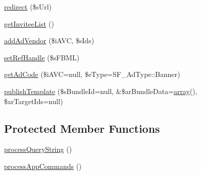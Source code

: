 \begin{DoxyCompactItemize}
\item 
\hyperlink{classSFApplication_a83d6db3f4e5f36ddd8adad2f53133e76}{redirect} (\$sUrl)
\item 
\hyperlink{classSFApplication_acf7865241ab5ac45a0f04674efe51d1a}{getInviteeList} ()
\item 
\hyperlink{classSFApplication_af12c69561c23be5e6fc7e4e0a2808fbb}{addAdVendor} (\$iAVC, \$sIds)
\item 
\hyperlink{classSFApplication_a3978cc0d9152ece4cd315601a95a38bd}{setRefHandle} (\$sFBML)
\item 
\hyperlink{classSFApplication_a99e97980251298d31efe3451470e8df5}{getAdCode} (\$iAVC=null, \$eType=SF\_\-AdType::Banner)
\item 
\hyperlink{classSFApplication_ac409888924f803214fbd2df44327242b}{publishTemplate} (\$sBundleId=null, \&\$arBundleData=\hyperlink{list_8php_aa3205d038c7f8feb5c9f01ac4dfadc88}{array}(), \$arTargetIds=null)
\end{DoxyCompactItemize}
\subsection*{Protected Member Functions}
\begin{DoxyCompactItemize}
\item 
\hyperlink{classSFApplication_aa40909289ffd00ccc071d938f586fc47}{processQueryString} ()
\item 
\hyperlink{classSFApplication_ac5e7c32ce7cbcf1f9f6e8684e8cefa5f}{processAppCommands} ()
\end{DoxyCompactItemize}
